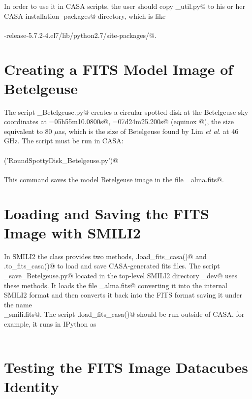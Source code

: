\documentclass[preprint]{aastex}
\begin{document}
In order to use it in CASA scripts, the user should copy \verb@alma_util.py@ to his or her CASA installation \verb@site-packages@ directory, which is like \\ \\
\verb@casa-release-5.7.2-4.el7/lib/python2.7/site-packages/@.


\section{Creating a FITS Model Image of Betelgeuse}

The script \verb@RoundSpottyDisk_Betelgeuse.py@ creates a circular spotted disk at the Betelgeuse sky coordinates at  \verb@RA=05h55m10.0800s@, \verb@DEC=07d24m25.200s@ (equinox @), the size equivalent to 80 $\mu$as, which is the size of Betelgeuse found by Lim \emph{et al.} at 46 GHz. The script must be run in CASA: \\ \\
\verb@execfile('RoundSpottyDisk_Betelgeuse.py')@ \\
\\
This command saves the model Betelgeuse image in the file \verb@RoundSpottyDisk_alma.fits@.


\section{Loading and Saving the FITS Image with SMILI2}

In SMILI2 the class \verb@imdata@ provides two methods, \verb@imdata.load_fits_casa()@ and \\ \verb@imdata.to_fits_casa()@ to load and save CASA-generated fits files. The script \\
\verb@load_save_Betelgeuse.py@ located in the top-level SMILI2 directory _dev@ uses these methods. It loads the file \verb@RoundSpottyDisk_alma.fits@ converting it into the internal SMILI2 format and then converts it back into the FITS format saving it under the name \\
\verb@RoundSpottyDisk_smili.fits@. The script \verb@imdata.load_fits_casa()@ should be run outside of CASA, for example, it runs in IPython as \\ \\
\verb@%run load_save_Betelgeuse.py @


\section{Testing the FITS Image Datacubes Identity}
\end{document}
